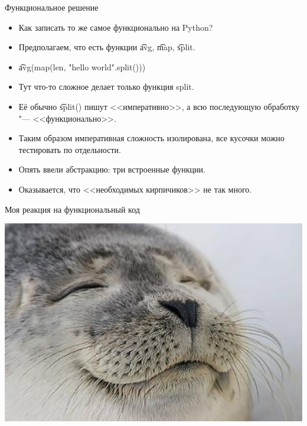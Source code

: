 \begin{frame}{Функциональное решение}
	\begin{itemize}
		\item Как записать то же самое функционально на Python? \pause
		\item Предполагаем, что есть функции \t{avg}, \t{map}, \t{split}. \pause
		\item \t{avg(map(len, "hello world".split()))} \pause
		\item Тут что-то сложное делает только функция split.
		\item Её обычно \t{split()} пишут <<императивно>>, а всю последующую обработку "--- <<функционально>>.
		\item Таким образом императивная сложность изолирована, все кусочки можно тестировать по отдельности.
		\item Опять ввели абстракцию: три встроенные функции.
		\item Оказывается, что <<необходимых кирпичиков>> не так много.
	\end{itemize}
\end{frame}

\begin{frame}{Моя реакция на функциональный код}
	\begin{center}
		\includegraphics[scale=0.3]{satisfied-seal.jpg}
	\end{center}
\end{frame}

